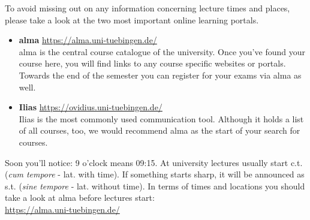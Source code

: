
To avoid missing out on any information concerning lecture times and places, please take a look at the two most important online learning portals.
\begin{itemize}
	\item \textbf{alma} \url{https://alma.uni-tuebingen.de/} \\
	alma is the central course catalogue of the university. Once you've found your course here, you will find links to any course specific websites or portals.
	Towards the end of the semester you can register for your exams via alma as well. 
	\item \textbf{Ilias} \url{https://ovidius.uni-tuebingen.de/} \\
	Ilias is the most commonly used communication tool. Although it holds a list of all courses, too, we would recommend alma as the start of your search for courses.
\end{itemize}

Soon you'll notice: 9 o'clock means 09:15. At university lectures usually start c.t. (\textit{cum
tempore} - lat. with time). If something starts \glqq sharp\grqq, it will be announced as s.t. (\textit{sine tempore} - lat. without
time). In terms of times and locations you should take a look at alma before lectures start:\\
\url{https://alma.uni-tuebingen.de/} \\ \\
